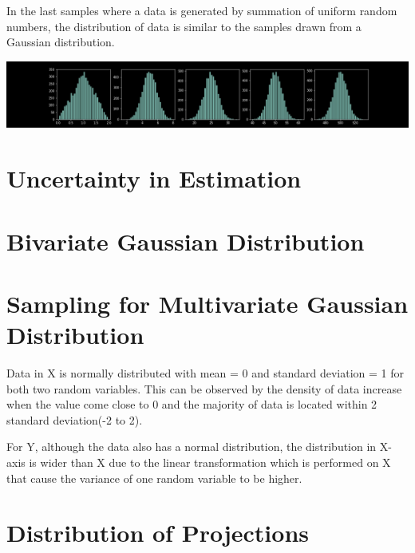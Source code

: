 \documentclass{article}
\begin{document}
In the last samples where a data is generated by summation of uniform random numbers, the distribution of data is similar to the samples drawn from a Gaussian distribution.
\begin{center}
\includegraphics[scale=0.4]{sum_random_numbers}
\end{center}

\maketitle
\section{Uncertainty in Estimation}

\maketitle
\section{Bivariate Gaussian Distribution}

\maketitle
\section{Sampling for Multivariate Gaussian Distribution}
Data in X is normally distributed with mean = 0 and standard deviation = 1 for both two random variables. This can be observed by the density of data increase when the value come close to 0 and the majority of data is located within 2 standard deviation(-2 to 2).

For Y, although the data also has a normal distribution, the distribution in X-axis is wider than X due to the linear transformation which is performed on X that cause the variance of one random variable to be higher.

\maketitle
\section{Distribution of Projections}
\end{document}
